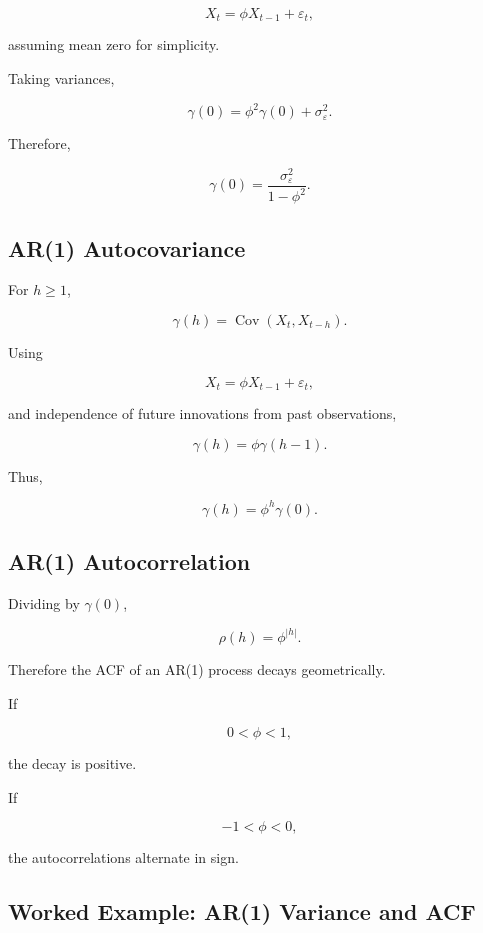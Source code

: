 \[
X_t
=
\phi X_{t-1}
+
\varepsilon_t,
\]

assuming mean zero for simplicity.

Taking variances,

\[
\gamma(0)
=
\phi^2\gamma(0)
+
\sigma_\varepsilon^2.
\]

Therefore,

\[
\boxed{
\gamma(0)
=
\frac{
\sigma_\varepsilon^2
}{
1-\phi^2
}.
}
\]

\subsection{AR(1) Autocovariance}
\label{subsec:ar1-autocovariance}

For \(h\geq1\),

\[
\gamma(h)
=
\operatorname{Cov}
(
X_t,
X_{t-h}
).
\]

Using

\[
X_t
=
\phi X_{t-1}
+
\varepsilon_t,
\]

and independence of future innovations from past observations,

\[
\boxed{
\gamma(h)
=
\phi\gamma(h-1).
}
\]

Thus,

\[
\boxed{
\gamma(h)
=
\phi^h\gamma(0).
}
\]

\subsection{AR(1) Autocorrelation}
\label{subsec:ar1-autocorrelation}

Dividing by \(\gamma(0)\),

\[
\boxed{
\rho(h)
=
\phi^{|h|}.
}
\]

Therefore the ACF of an AR(1) process decays geometrically.

If

\[
0<\phi<1,
\]

the decay is positive.

If

\[
-1<\phi<0,
\]

the autocorrelations alternate in sign.

\subsection{Worked Example: AR(1) Variance and ACF}
\label{subsec:worked-ar1}

